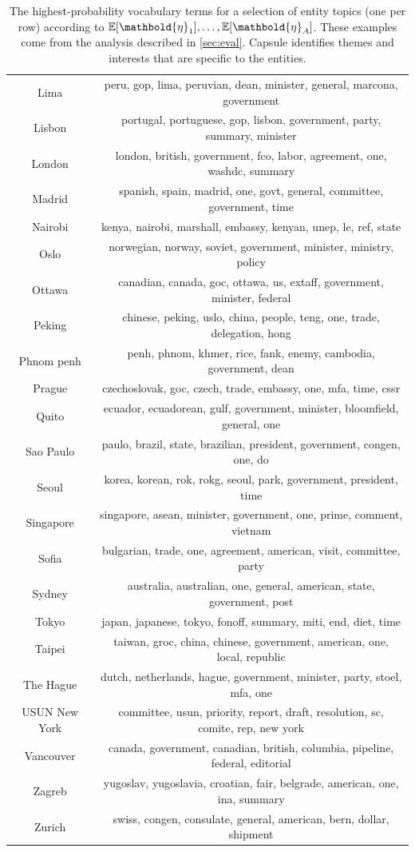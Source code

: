 \begin{table}[htb]
\begin{tabular}{cc}
Lima & peru, gop, lima, peruvian, dean, minister, general, marcona, government \\
Lisbon & portugal, portuguese, gop, lisbon, government, party, summary, minister \\
London & london, british, government, fco, labor, agreement, one, washdc, summary \\
Madrid & spanish, spain, madrid, one, govt, general, committee, government, time \\
Nairobi & kenya, nairobi, marshall, embassy, kenyan, unep, le, ref, state \\
Oslo & norwegian, norway, soviet, government, minister, ministry, policy \\
Ottawa & canadian, canada, goc, ottawa, us, extaff, government, minister, federal \\
Peking & chinese, peking, uslo, china, people, teng, one, trade, delegation, hong \\
Phnom penh & penh, phnom, khmer, rice, fank, enemy, cambodia, government, dean \\
Prague & czechoslovak, goc, czech, trade, embassy, one, mfa, time, cssr \\
Quito & ecuador, ecuadorean, gulf, government, minister, bloomfield, general, one \\
Sao Paulo & paulo, brazil, state, brazilian, president, government, congen, one, do \\
Seoul & korea, korean, rok, rokg, seoul, park, government, president, time \\
Singapore & singapore, asean, minister, government, one, prime, comment, vietnam \\
Sofia & bulgarian, trade, one, agreement, american, visit, committee, party \\
Sydney & australia, australian, one, general, american, state, government, post \\
Tokyo & japan, japanese, tokyo, fonoff, summary, miti, end, diet, time \\
Taipei & taiwan, groc, china, chinese, government, american, one, local, republic \\
The Hague & dutch, netherlands, hague, government, minister, party, stoel, mfa, one \\
USUN New York & committee, usun, priority, report, draft, resolution, sc, comite, rep, new york \\
Vancouver & canada, government, canadian, british, columbia, pipeline, federal, editorial \\
Zagreb & yugoslav, yugoslavia, croatian, fair, belgrade, american, one, ina, summary \\
Zurich & swiss, congen, consulate, general, american, bern, dollar, shipment \\
\bottomrule
\end{tabular}
\caption{The highest-probability vocabulary terms
for a selection of
entity topics (one per row) according to
$\E[\mathbold{\eta}_1], \ldots, \E[\mathbold{\eta}_A]$. These
examples come from the analysis described in \cref{sec:eval}. Capsule
identifies themes and interests that are specific to the entities.}
\label{tab:entities}
\end{table}

